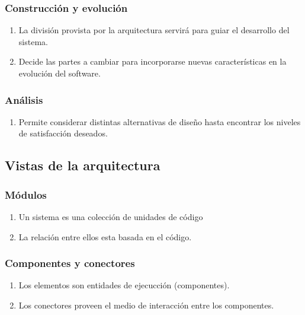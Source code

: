     \subsubsection{Construcción y evolución}
      \begin{enumerate}[-]
        \item La división provista por la arquitectura servirá para guiar el desarrollo del sistema.
        \item Decide las partes a cambiar para incorporarse nuevas características en la evolución del software.
      \end{enumerate}

    \subsubsection{Análisis}
      \begin{enumerate}[-]
        \item Permite considerar distintas alternativas de diseño hasta encontrar los niveles de satisfacción deseados.
      \end{enumerate}

  \pagebreak

  \subsection{Vistas de la arquitectura}

    \subsubsection{Módulos}
      \begin{enumerate}[-]
        \item Un sistema es una colección de unidades de código
        \item La relación entre ellos esta basada en el código.
      \end{enumerate}

    \subsubsection{Componentes y conectores}
      \begin{enumerate}[-]
        \item Los elementos son entidades de ejecucción  (componentes).
        \item Los conectores proveen el medio de interacción entre los componentes.
      \end{enumerate}

